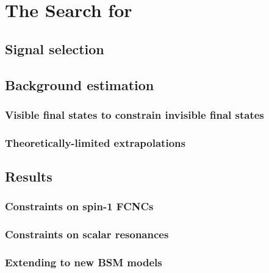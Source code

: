 \chapter{The Search for \monotop}

\section{Signal selection}

\section{Background estimation}

\subsection{Visible final states to constrain invisible final states}

\subsection{Theoretically-limited extrapolations}

\section{Results}

\subsection{Constraints on spin-1 FCNCs}

\subsection{Constraints on scalar resonances}

\subsection{Extending to new BSM models}

